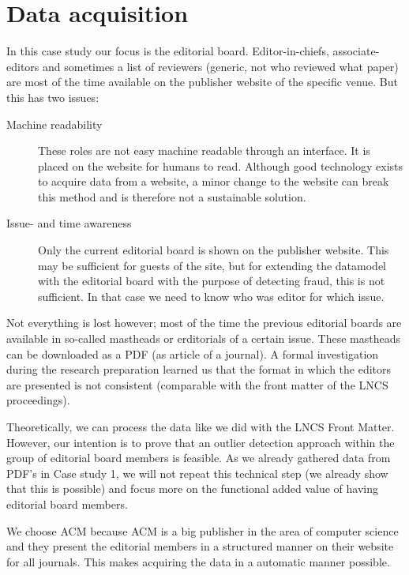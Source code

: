 \documentclass{ou-report}
\newcommand{\lncs}{LNCS}
\begin{document}
\section{Data acquisition}
In this case study our focus is the editorial board. Editor-in-chiefs, 
associate-editors and sometimes a list of reviewers (generic, not who reviewed 
what paper) are most of the time available on the publisher website of the 
specific venue. But this has two issues:
\begin{description}
    \item[Machine readability] These roles are not easy machine readable 
    through an interface. It is placed on the website for humans to read. 
    Although good technology exists to acquire data from a website, a minor 
    change to 
    the website can break this method and is therefore not a sustainable
    solution.
    \item[Issue- and time awareness] Only the current editorial board is 
    shown on the publisher website. This may be sufficient for guests of the 
    site, but for extending the datamodel with the editorial board with the 
    purpose of detecting fraud, this is not sufficient. In that case we need 
    to know who was editor for which issue. 
\end{description}
Not everything is lost however; most of the time the previous editorial 
boards are available in so-called mastheads or erditorials of a certain 
issue. These 
mastheads can be downloaded as a PDF (as article of a journal). A formal 
investigation during the research preparation learned us that the format in 
which the editors are presented is not consistent (comparable with the 
front matter of the \lncs{} proceedings).

Theoretically, we can process the data like we did with the \lncs{} Front 
Matter. However, our intention is to prove that an outlier detection 
approach within the group of editorial board members is feasible. As we 
already gathered data from PDF's in Case study 1, we will not repeat this 
technical step (we already show that this is possible) and focus more on 
the functional added value of having editorial board members.

We choose ACM because ACM is a big publisher in the area of computer science
and they present the editorial members in a structured manner on their 
website for all journals. This makes acquiring the data in a automatic 
manner possible.
\end{document}
